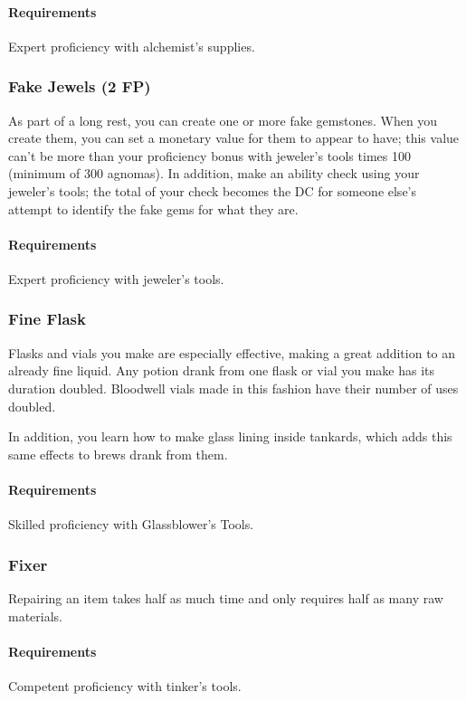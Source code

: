     \paragraph{Requirements} Expert proficiency with alchemist's supplies.
\subsubsection{Fake Jewels (2 FP)} \label{feat::fakejewels}
    As part of a long rest, you can create one or more fake gemstones.
    When you create them, you can set a monetary value for them to appear to have; this value can't be more than your proficiency bonus with jeweler's tools times 100 (minimum of 300 agnomas).
    In addition, make an ability check using your jeweler's tools; the total of your check becomes the DC for someone else's attempt to identify the fake gems for what they are.
    \paragraph{Requirements} Expert proficiency with jeweler's tools.
\subsubsection{Fine Flask} \label{feat::fineflask}
    Flasks and vials you make are especially effective, making a great addition to an already fine liquid.
    Any potion drank from one flask or vial you make has its duration doubled.
    Bloodwell vials made in this fashion have their number of uses doubled.

    In addition, you learn how to make glass lining inside tankards, which adds this same effects to brews drank from them.
    \paragraph{Requirements} Skilled proficiency with Glassblower's Tools.
\subsubsection{Fixer} \label{feat::fixer}
    Repairing an item takes half as much time and only requires half as many raw materials.
    \paragraph{Requirements} Competent proficiency with tinker's tools.
